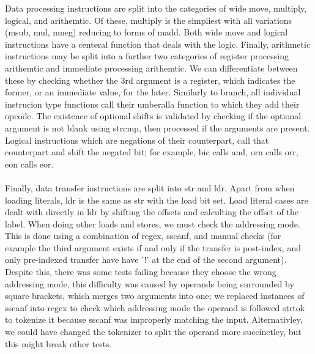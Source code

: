 \documentclass[11pt]{article}
\begin{document}
Data processing instructions are split into the categories of wide move, multiply, logical, and arithemtic. Of these, multiply is the simpliest with all variations (msub, mul, mneg) reducing to forms of madd. Both wide move and logical instructions have a centeral function that deals with the logic. Finally, arithmetic instructions may be split into a further two categories of register processing arithemtic and immediate processing arithemtic. We can differentiate between these by checking whether the 3rd argument is a register, which indicates the former, or an immediate value, for the later. Similarly to branch, all individual instrucion type functions call their umberalla function to which they add their opcode. The existence of optional shifts is validated by checking if the optional argument is not blank using strcmp, then processed if the arguments are present. Logical instructions which are negations of their counterpart, call that counterpart and shift the negated bit; for example, bic calls and, orn calls orr, eon calls eor. \\\\
Finally, data transfer instructions are split into str and ldr. Apart from when loading literals, ldr is the same as str with the load bit set. Load literal cases are dealt with directly in ldr by shifting the offsets and calculting the offset of the label. When doing other loads and stores, we must check the addressing mode.  This is done using a combination of regex, sscanf, and manual checks (for example the third argument exists if and only if the transfer is post-index, and only pre-indexed transfer have have '!' at the end of the second argument). Despite this, there was some tests failing because they choose the wrong addressing mode, this difficulty was caused by operands being surrounded by square brackets, which merges two arguments into one; we replaced instances of sscanf into regex to check which addressing mode the operand is followed strtok to tokenize it because sscanf was improperly matching the input. Alternativley, we could have changed the tokenizer to split the operand more succinctley, but this might break other tests.
\end{document}
